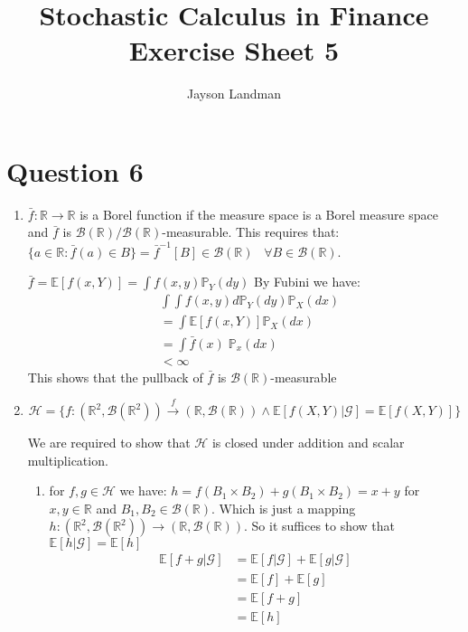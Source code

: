 \documentclass[12pt, letterpaper]{article}
\title{Stochastic Calculus in Finance\\
		\large Exercise Sheet 5}
\author{Jayson Landman}
\begin{document}
	\section*{Question 6}
	 
	 
	\begin{enumerate} [label = \textbf{\alph*)}]
	\item $\bar{f} : \mathbb{R} \rightarrow \mathbb{R}$ is a Borel function if the measure space is a Borel measure space and $\bar{f}$ is $\mathcal{B}(\mathbb{R})/\mathcal{B}(\mathbb{R})$-measurable. This requires that: \newline $\{a \in \mathbb{R} : \bar{f}(a) \in B \}  = \bar{f}^{-1}[B] \in \mathcal{B}(\mathbb{R}) \; \; \; \forall B \in \mathcal{B}(\mathbb{R})$.

	\vspace{0.3cm}
	$\bar{f} = \mathbb{E}[f(x, Y)] = \int f(x, y) \mathbb{P}_Y (dy)$ \newline
	By Fubini we have: \begin{align*}
		& \int \int f(x, y) d\mathbb{P}_Y (dy) \mathbb{P}_X (dx) \\
		& = \int \mathbb{E}[f(x, Y)] \mathbb{P}_X (dx) \\
		& = \int \bar{f}(x) \;\mathbb{P}_x (dx) \\
		& < \infty \tag{$f$ is a bounded function}
	\end{align*}
	This shows that the pullback of $\bar{f}$ is $\mathcal{B}(\mathbb{R})$-measurable

	\item  $$\mathcal{H} = \bigg\{ f : (\mathbb{R}^2, \mathcal{B}(\mathbb{R}^2)) \xrightarrow{f}(\mathbb{R}, \mathcal{B}(\mathbb{R})) \wedge \mathbb{E}[f(X, Y)|\mathcal{G}]=\mathbb{E}[f(X, Y)] \bigg \}$$
	
	We are required to show that $\mathcal{H}$ is closed under addition and scalar multiplication.
	
	\begin{enumerate} [label = \roman*)]
		\item for $f, g \in \mathcal{H}$ we have: \newline
		$h = f(B_1\times B_2)+g(B_1\times B_2) = x +y$ for $x, y \in \mathbb{R}$ and $B_1, B_2 \in \mathcal{B}(\mathbb{R})$. \newline Which is just a mapping $h : (\mathbb{R}^2, \mathcal{B}(\mathbb{R}^2)) \rightarrow (\mathbb{R}, \mathcal{B}(\mathbb{R}))$. \newline
		So it suffices to show that $\mathbb{E}[h|\mathcal{G}] = \mathbb{E}[h]$ 
\begin{align*}
	\mathbb{E}[f + g|\mathcal{G}] & = \mathbb{E}[f|\mathcal{G}] + \mathbb{E}[g|\mathcal{G}] \\
	& = \mathbb{E}[f] + \mathbb{E}[g] \\ 
	& = \mathbb{E}[f + g] \\
	& = \mathbb{E}[h]
\end{align*}


\end{enumerate}
\end{enumerate}
\end{document}
